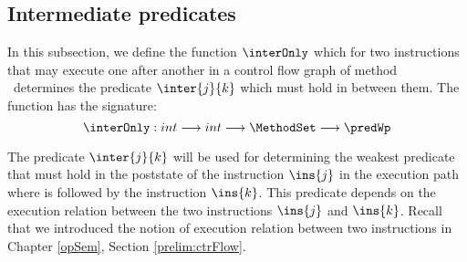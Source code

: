 \newtheorem{defInter}{Definition}[subsection]
\subsection{Intermediate predicates} \label{wp:interPred}
In this subsection, we define the function $\interOnly$ which for two instructions that may execute one
after another in a control flow graph  of  method \methodd \ determines the predicate $\inter{j}{k}$ which must hold in between them.
The function has the signature:
$$ \interOnly: int \longrightarrow int  \longrightarrow \MethodSet \longrightarrow \predWp $$ 


 The predicate $\inter{j}{k}$ will be used for determining the weakest predicate that must hold in the poststate of the instruction
 $\ins{j}$ in the execution path where   is followed by the instruction $\ins{k}$.
 This predicate depends on the execution relation between the two instructions $\ins{j}$ and $\ins{k}$.
 Recall that  we introduced the notion of execution  relation between two instructions  in Chapter \ref{opSem},
 Section \ref{prelim:ctrFlow}. %



